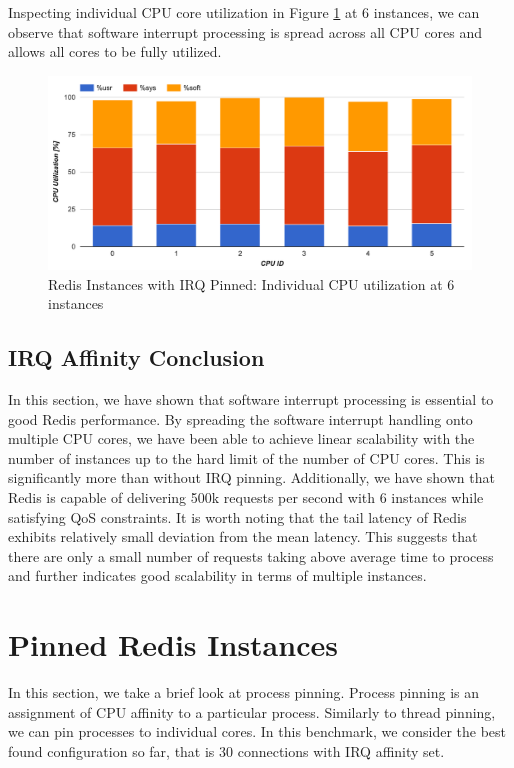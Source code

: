 Inspecting individual CPU core utilization in Figure \ref{fig:r_irq_cpu_individual} at 6 instances, we can observe that software interrupt processing is spread across all CPU cores and allows all cores to be fully utilized.

\begin{figure}[h]
    \includegraphics[width=\textwidth]{./res2/r_irq_cpu_individual.png}
    \caption{Redis Instances with IRQ Pinned: Individual CPU utilization at 6 instances}
    \label{fig:r_irq_cpu_individual}
\end{figure}

\subsection{IRQ Affinity Conclusion}
In this section, we have shown that software interrupt processing is essential to good Redis performance. By spreading the software interrupt handling onto multiple CPU cores, we have been able to achieve linear scalability with the number of instances up to the hard limit of the number of CPU cores. This is significantly more than without IRQ pinning. Additionally, we have shown that Redis is capable of delivering 500k requests per second with 6 instances while satisfying QoS constraints. It is worth noting that the tail latency of Redis exhibits relatively small deviation from the mean latency. This suggests that there are only a small number of requests taking above average time to process and further indicates good scalability in terms of multiple instances.


\section{Pinned Redis Instances}
In this section, we take a brief look at process pinning. Process pinning is an assignment of CPU affinity to a particular process. Similarly to thread pinning, we can pin processes to individual cores. In this benchmark, we consider the best found configuration so far, that is 30 connections with IRQ affinity set.

